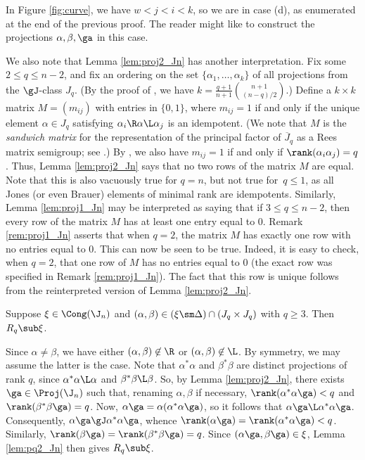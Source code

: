 %
\begin{rem}
In Figure \ref{fig:curve}, we have $w<j<i<k$, so we are in case (d), as enumerated at the end of the previous proof.  The reader might like to construct the projections $\alpha,\beta,\ga$ in this case.  
\end{rem}


\begin{rem}\label{rem:proj2_Jn}
We also note that Lemma \ref{lem:proj2_Jn} has another interpretation.
% 
Fix some $2\leq q\leq n-2$, and fix an ordering on the set $\{\alpha_1,\ldots,\alpha_k\}$ of all projections from the $\gJ$-class $J_q$.  (By the proof of \cite[Theorem~9.5]{EG2017}, we have $k=\frac{q+1}{n+1}\binom{n+1}{(n-q)/2}$.)  Define a $k\times k$ matrix $M=(m_{ij})$ with entries in $\{0,1\}$, where $m_{ij}=1$ if and only if 
the unique element $\alpha\in J_q$ satisfying $\alpha_i\R\alpha\L\alpha_j$ is an idempotent.
(We note that $M$ is the \emph{sandwich matrix} for the representation of the principal factor of $\overline{J}_q$ as a Rees matrix semigroup; see \cite[Section 3.2]{Howie}.)
By \cite[Lemma 2.3(ii)]{emojoka}, we also have $m_{ij}=1$ if and only if $\rank(\alpha_i\alpha_j)=q$.  Thus, Lemma \ref{lem:proj2_Jn} says that no two rows of the matrix $M$ are equal.  Note that this is also vacuously true for $q=n$, but not true for~$q\leq1$, as all Jones (or even Brauer) elements of minimal rank are idempotents.  Similarly, Lemma \ref{lem:proj1_Jn} may be interpreted as saying that if $3\leq q\leq n-2$, then every row of the matrix $M$ has at least one entry equal to $0$.  Remark \ref{rem:proj1_Jn} asserts that when $q=2$, the matrix $M$ has exactly one row with no entries equal to $0$.  This can now be seen to be true.  Indeed, it is easy to check, when $q=2$, that one row of $M$ has no entries equal to $0$ (the exact row was specified in Remark \ref{rem:proj1_Jn}).  The fact that this row is unique follows from the reinterpreted version of Lemma \ref{lem:proj2_Jn}.
\end{rem}




\begin{lemma}\label{lem:qq_Jn}
Suppose $\xi\in\Cong(\J_n)$ and $(\alpha,\beta)\in (\xi\sm\Delta)\cap (J_q\times J_q)$ with $q\geq3$.  Then $R_q\sub\xi$.
\end{lemma}


\pf Since $\alpha\not=\beta$, we have either $(\alpha,\beta)\not\in{\R}$ or $(\alpha,\beta)\not\in{\L}$.  By symmetry, we may assume the latter is the case.  Note that $\alpha^*\alpha$ and $\beta^*\beta$ are distinct projections of rank $q$, since $\alpha^*\alpha\L\alpha$ and $\beta^*\beta\L\beta$.  So, by Lemma \ref{lem:proj2_Jn}, there exists $\ga\in\Proj(\J_n)$ such that, renaming $\alpha,\beta$ if necessary, $\rank(\alpha^*\alpha\ga)<q$ and $\rank(\beta^*\beta\ga)=q$.  Now, $\alpha\ga=\alpha(\alpha^*\alpha\ga)$, so it follows that $\alpha\ga\L\alpha^*\alpha\ga$.  Consequently, $\alpha\ga\gJ\alpha^*\alpha\ga$, whence ${\rank(\alpha\ga)=\rank(\alpha^*\alpha\ga)<q}$.  Similarly, $\rank(\beta\ga)=\rank(\beta^*\beta\ga)=q$.  Since $(\alpha\ga,\beta\ga)\in\xi$, Lemma \ref{lem:pq2_Jn} then gives $R_q\sub\xi$. \epf


